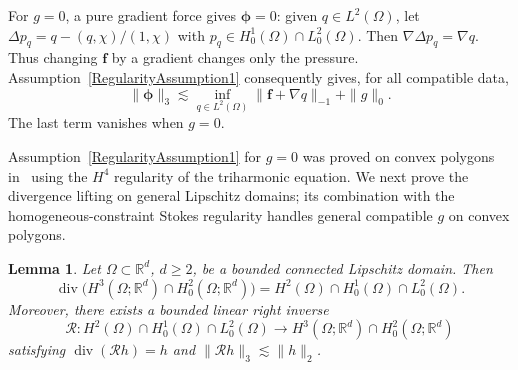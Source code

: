 \documentclass[10pt]{amsart}
\newtheorem{lemma}[theorem]{Lemma}
\renewcommand{\div}{\operatorname{div}}
\numberwithin{equation}{section}
\begin{document}
For $g=0$, a pure gradient force gives $\boldsymbol\phi=0$: given $q\in L^2(\Omega)$, let $\Delta p_q=q-(q,\chi)/(1,\chi)$ with $p_q\in H_0^1(\Omega)\cap L_0^2(\Omega)$. Then $\nabla\Delta p_q=\nabla q$. Thus changing $\boldsymbol f$ by a gradient changes only the pressure. Assumption~\ref{RegularityAssumption1} consequently gives, for all compatible data,
\begin{equation}\label{eq:fourthorderStokesregularity2}
\|\boldsymbol\phi\|_3\lesssim
\inf_{q\in L^2(\Omega)}\|\boldsymbol f+\nabla q\|_{-1}+\|g\|_0.
\end{equation}
The last term vanishes when $g=0$.

Assumption~\ref{RegularityAssumption1} for $g=0$ was proved on convex polygons in~\cite[Theorem~3.6]{ChenHuangHuang2023} using the $H^4$ regularity of the triharmonic equation. We next prove the divergence lifting on general Lipschitz domains; its combination with the homogeneous-constraint Stokes regularity handles general compatible $g$ on convex polygons.

\begin{lemma}\label{lem:main}
Let $\Omega\subset\mathbb R^d$, $d\geq2$, be a bounded connected Lipschitz domain. Then
\[
\div\big(H^3(\Omega;\mathbb R^d)\cap H_0^2(\Omega;\mathbb R^d)\big)
=H^2(\Omega)\cap H_0^1(\Omega)\cap L_0^2(\Omega).
\]
Moreover, there exists a bounded linear right inverse
\[
\mathcal R:H^2(\Omega)\cap H_0^1(\Omega)\cap L_0^2(\Omega)
\longrightarrow H^3(\Omega;\mathbb R^d)\cap H_0^2(\Omega;\mathbb R^d)
\]
satisfying $\div(\mathcal Rh)=h$ and $\|\mathcal Rh\|_3\lesssim\|h\|_2$.
\end{lemma}
\end{document}
